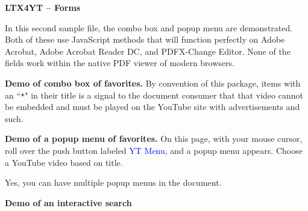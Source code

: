 \documentclass{article}
\begin{document}

\begin{center}\bfseries\Large\color{blue}LTX4YT -- Forms\end{center}

In this second sample file, the combo box and popup menu are
demonstrated. Both of these use JavaScript methods that will
function perfectly on \textsf{Adobe Acrobat}, \textsf{Adobe
Acrobat Reader DC}, and \textsf{PDFX-Change Editor}. None of the fields
work within the native PDF viewer of modern browsers.

\textbf{Demo of combo box of favorites.} By convention of this
package, items with an ``\texttt{*}" in their title is a signal to
the document consumer that that video cannot be
embedded and must be played on the YouTube site with
advertisements and such. \vspace{-\parskip}
\begin{quote}
\olBdry
\end{quote}

\textbf{Demo of a popup menu of favorites.}
On this page, with your mouse cursor, roll over the push button labeled \textcolor{blue}{\textsf{YT Menu}}, and a popup
menu appears. Choose a YouTube video based on title.

 Yes, you can have multiple popup menus in the document.

\textbf{Demo of an interactive search}\\[3pt]
\ytInputQuery{1.5in}{11bp}\olBdry
\ytSearch{}{11bp}\olBdry
\ytClearQuery{}{11bp}
\end{document}
